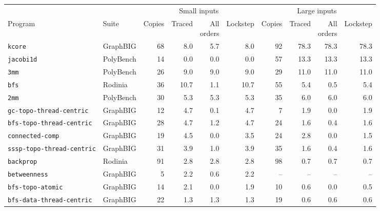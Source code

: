 \begin{tabular}{llrrrrrrrr}
\toprule
 & & \multicolumn{4}{c}{Small inputs} & \multicolumn{4}{c}{Large inputs} \\
\cmidrule(lr){3-6} \cmidrule(lr){7-10}
Program & Suite & Copies & Traced & \shortstack{All\\orders} & Lockstep & Copies & Traced & \shortstack{All\\orders} & Lockstep \\
\midrule
\texttt{kcore} & GraphBIG & 68 & 8.0 & 5.7 & 8.0 & 92 & 78.3 & 78.3 & 78.3 \\
\texttt{jacobi1d} & PolyBench & 14 & 0.0 & 0.0 & 0.0 & 57 & 13.3 & 13.3 & 13.3 \\
\texttt{3mm} & PolyBench & 26 & 9.0 & 9.0 & 9.0 & 29 & 11.0 & 11.0 & 11.0 \\
\texttt{bfs} & Rodinia & 36 & 10.7 & 1.1 & 10.7 & 55 & 5.4 & 0.5 & 5.4 \\
\texttt{2mm} & PolyBench & 30 & 5.3 & 5.3 & 5.3 & 35 & 6.0 & 6.0 & 6.0 \\
\texttt{gc-topo-thread-centric} & GraphBIG & 12 & 4.7 & 0.1 & 4.7 & 7 & 1.9 & 0.0 & 1.9 \\
\texttt{bfs-topo-thread-centric} & GraphBIG & 28 & 4.7 & 1.2 & 4.7 & 24 & 1.6 & 0.4 & 1.6 \\
\texttt{connected-comp} & GraphBIG & 19 & 4.5 & 0.0 & 3.5 & 24 & 2.8 & 0.0 & 1.5 \\
\texttt{sssp-topo-thread-centric} & GraphBIG & 31 & 3.9 & 1.0 & 3.9 & 35 & 1.6 & 0.4 & 1.6 \\
\texttt{backprop} & Rodinia & 91 & 2.8 & 2.8 & 2.8 & 98 & 0.7 & 0.7 & 0.7 \\
\texttt{betweenness} & GraphBIG & 5 & 2.2 & 0.6 & 2.2 & -- & -- & -- & -- \\
\texttt{bfs-topo-atomic} & GraphBIG & 14 & 2.1 & 0.0 & 1.9 & 10 & 0.6 & 0.0 & 0.5 \\
\texttt{bfs-data-thread-centric} & GraphBIG & 22 & 1.3 & 1.3 & 1.3 & 19 & 0.6 & 0.6 & 0.6 \\
\bottomrule
\end{tabular}
